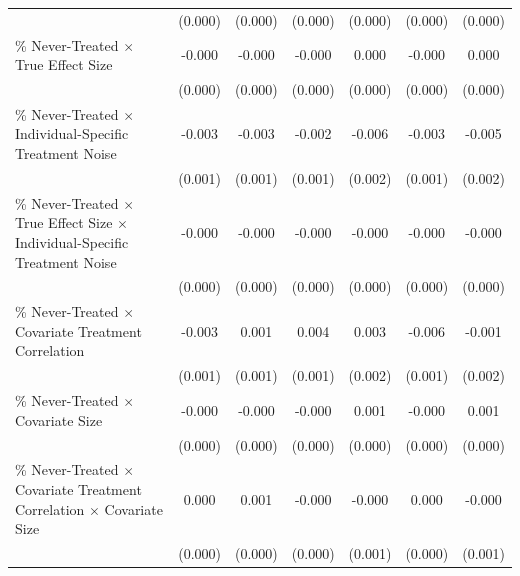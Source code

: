 \documentclass[12pt]{article}
\begin{document}
\begin{table}[htbp]
{\begin{tabular}{p{4.5in}|*{6}{c}}
                    &     (0.000)         &     (0.000)         &     (0.000)         &     (0.000)         &     (0.000)         &     (0.000)         \\
\% Never-Treated $\times$ True Effect Size&      -0.000         &      -0.000         &      -0.000         &       0.000         &      -0.000         &       0.000         \\
                    &     (0.000)         &     (0.000)         &     (0.000)         &     (0.000)         &     (0.000)         &     (0.000)         \\
\% Never-Treated $\times$ Individual-Specific Treatment Noise&      -0.003\sym{***}&      -0.003\sym{***}&      -0.002\sym{***}&      -0.006\sym{***}&      -0.003\sym{***}&      -0.005\sym{***}\\
                    &     (0.001)         &     (0.001)         &     (0.001)         &     (0.002)         &     (0.001)         &     (0.002)         \\
\% Never-Treated $\times$ True Effect Size $\times$ Individual-Specific Treatment Noise&      -0.000         &      -0.000         &      -0.000         &      -0.000         &      -0.000         &      -0.000         \\
                    &     (0.000)         &     (0.000)         &     (0.000)         &     (0.000)         &     (0.000)         &     (0.000)         \\
\% Never-Treated $\times$ Covariate Treatment Correlation&      -0.003\sym{**} &       0.001         &       0.004\sym{***}&       0.003         &      -0.006\sym{***}&      -0.001         \\
                    &     (0.001)         &     (0.001)         &     (0.001)         &     (0.002)         &     (0.001)         &     (0.002)         \\
\% Never-Treated $\times$ Covariate Size&      -0.000         &      -0.000         &      -0.000         &       0.001\sym{**} &      -0.000         &       0.001\sym{*}  \\
                    &     (0.000)         &     (0.000)         &     (0.000)         &     (0.000)         &     (0.000)         &     (0.000)         \\
\% Never-Treated $\times$ Covariate Treatment Correlation $\times$ Covariate Size&       0.000         &       0.001         &      -0.000         &      -0.000         &       0.000         &      -0.000         \\
                    &     (0.000)         &     (0.000)         &     (0.000)         &     (0.001)         &     (0.000)         &     (0.001)         \\

\end{tabular}}
\end{table}
\end{document}
